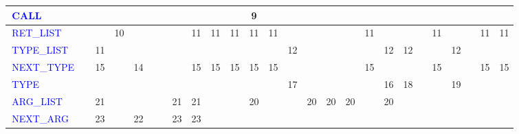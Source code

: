 \documentclass[a4paper]{article}
\theoremstyle{definition}
\newcommand{\nter}[1]{\textcolor{blue}{\,#1\,}}
\begin{document}
\begin{center}
{\begin{tabular}{| l || c | c | c | c | c | c | c | c | c | c | c | c | c | c | c | c | c | c | c | c | c | c | c | c | c |}
	\nter{CALL}        &         &         &         &         &         &          &            &           &                &              & 9        &          &               &                &                   &                   &             &           &              &               &              &              &            &             & \\\hline
	\nter{RET\_LIST}   &         &         &    10   &         &         &          &            &      11   &      11        &      11      &      11  &    11    &               &                &                   &                   &      11     &           &              &               &      11      &              &            &      11     & 11 \\\hline
	\nter{TYPE\_LIST}  &         &    11   &         &         &         &          &            &           &                &              &          &          &      12       &                &                   &                   &             &      12   & 12           &               &              &      12      &            &             & \\\hline
	\nter{NEXT\_TYPE}  &         &     15  &         &     14  &         &          &            &      15   &      15        &      15      &     15   &      15  &               &                &                   &                   &      15     &           &              &               &      15      &              &            &      15     & 15 \\\hline
	\nter{TYPE}        &         &         &         &         &         &          &            &           &                &              &          &          &      17       &                &                   &                   &             &      16   &      18      &               &              &     19       &            &             & \\\hline
	\nter{ARG\_LIST}   &         &    21   &         &         &         &          &      21    &      21   &                &              &      20  &          &               &      20        & 20                &  20               &             &      20   &              &               &              &              &            &             & \\\hline
	\nter{NEXT\_ARG}   &         &   23    &         &     22  &         &          &      23    &      23   &                &              &          &          &               &                &                   &                   &             &           &              &               &              &              &            &             & \\\hline

\end{tabular}}
\end{center}
\end{document}
